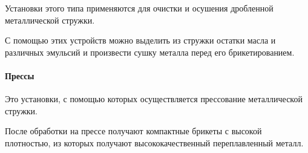 Установки этого типа применяются для очистки и осушения дробленной металлической стружки.

С помощью этих устройств можно выделить из стружки остатки масла и различных эмульсий и произвести сушку металла перед его брикетированием.

\paragraph{Прессы}

Это установки, с помощью которых осуществляется прессование металлической стружки.

После обработки на прессе получают компактные брикеты с высокой плотностью, из которых получают высококачественный переплавленный металл.

